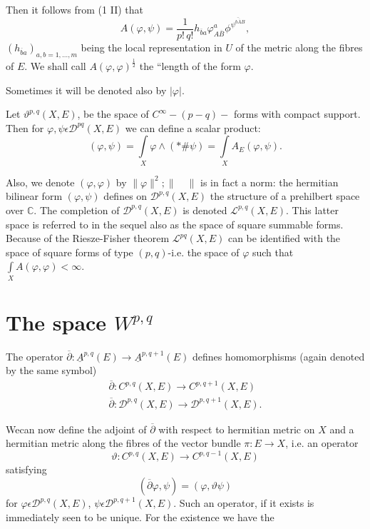 Then it follows from (1 II) that 
$$ 
A(\varphi, \psi) = \frac{1}{p! \, q!} h_{\overline{b}a} \varphi^{a}_{A
  \overline{B}} \phi^{\overline{\psi^{b \overline{A}B}}},  
$$
$(h_{\overline{b}a})_{a,b = 1, \ldots , m}$ being the local
representation in $U$ of the metric along the fibres of $E$. We shall call
$A(\varphi , \varphi )^{\frac{1}{2}}$ the ``length of the form $\varphi$.  

Sometimes it will be denoted also by $ |\varphi |$.

Let $ \vartheta^{p,q} (X,E)$, be the space of $C^{\infty}-(p-q)-$
forms with compact support. Then for $\varphi, \psi \epsilon
\mathscr{D}^{pq} (X,E)$ we can define a scalar product:  
$$ 
(\varphi, \psi) = \underset{X}{\int} \varphi \wedge (* \# \psi ) =
\underset{X}{\int} A_{E}(\varphi, \psi). 
$$ 

Also, we denote $(\varphi , \varphi) $ by $ \| \varphi \|^{2};\| \quad
\|$ is in fact a norm: the hermitian bilinear form $(\varphi, \psi)$
defines on $ \mathscr{D}^{p,q}(X,E)$ the structure of a prehilbert
space over $\mathbb{C}$. The completion of $\mathcal{D}^{p,q}(X,E)$ is
denoted $\mathcal{L}^{p,q} (X,E)$. This latter space is referred to in the
sequel also as the space of square summable forms. Because of the
Riesze-Fisher theorem $ \mathcal{L}^{pq}(X,E) $ can be identified with
the space of square forms of type $(p,q)$-i.e. the space of $\varphi$
such that $\underset {X}{\int} A (\varphi , \varphi) < \infty$.    

\section{The space $ W^{p,q}$}\label{chap1:sec2} %

The operator $ \overline{\partial}: \underline{A}^{p,q}(E) \rightarrow
\underline{A}^{p,q+1} (E)$ defines homomorphisms (again denoted by
the same symbol) 
\begin{gather*}
  \overline{\partial}: C^{p,q} (X,E) \rightarrow C^{p,q+1} (X,E) \\
  \overline{\partial}: \mathscr{D}^{p,q} (X,E) \rightarrow
  \mathscr{D}^{p,q+1} (X,E).
\end{gather*}

We\pageoriginale can now define the adjoint of $ \overline{\partial}$
with respect to hermitian metric on $X$ and a hermitian metric along
the fibres of the vector bundle $ \pi : E \rightarrow X$, i.e. an
operator  
$$  
  \vartheta : C^{p,q}(X,E) \rightarrow C^{p,q-1}(X,E)
$$
satisfying
\begin{equation*}
 (\overline{\partial} \varphi, \psi) = 
  (\varphi, \vartheta \psi)  \tag{1.1}\label{eq1.1}
\end{equation*}
for \qquad $\varphi \epsilon \mathscr{D}^{p,q}(X,E)$, $\psi
  \epsilon \mathscr{D}^{p,q+1}(X,E)$. Such an operator, if it exists
  is immediately seen to be unique. For the existence we have the    

